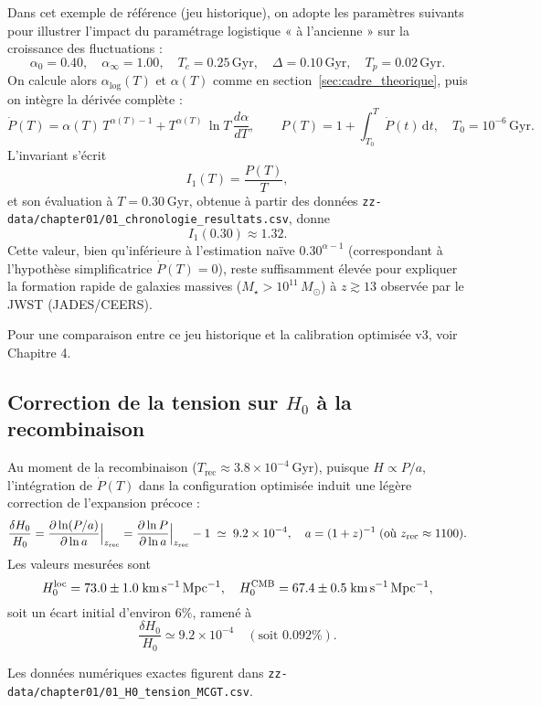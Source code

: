 Dans cet exemple de référence (jeu historique), on adopte les paramètres suivants pour illustrer l’impact du paramétrage logistique « à l’ancienne » sur la croissance des fluctuations :
\[
  \alpha_{0}=0.40,\quad
  \alpha_{\infty}=1.00,\quad
  T_{c}=0.25\,\mathrm{Gyr},\quad
  \Delta=0.10\,\mathrm{Gyr},\quad
  T_{p}=0.02\,\mathrm{Gyr}.
\]
On calcule alors \(\alpha_{\mathrm{log}}(T)\) et \(\alpha(T)\) comme en section~\ref{sec:cadre_theorique}, puis on intègre la dérivée complète :
\[
  \dot P(T)
    = \alpha(T)\,T^{\alpha(T)-1}
    + T^{\alpha(T)}\,\ln T\,\frac{d\alpha}{dT},
\qquad
  P(T)
    = 1 + \int_{T_{0}}^{T}\dot P(t)\,\mathrm{d}t,
\quad
  T_{0}=10^{-6}\,\mathrm{Gyr}.
\]
L’invariant s’écrit
\[
  I_{1}(T)=\frac{P(T)}{T},
\]
et son évaluation à \(T=0.30\) Gyr, obtenue à partir des données
\texttt{zz-data/chapter01/01\_chronologie\_resultats.csv}, donne
\[
  I_{1}(0.30)\approx1.32.
\]
Cette valeur, bien qu’inférieure à l’estimation naïve \(0.30^{\alpha-1}\) (correspondant à l’hypothèse simplificatrice \(\dot P(T)=0\)), reste suffisamment élevée pour expliquer la formation rapide de galaxies massives (\(M_{\star}>10^{11}\,M_{\odot}\)) à \(z\gtrsim13\) observée par le JWST (JADES/CEERS).

Pour une comparaison entre ce jeu historique et la calibration optimisée v3, voir Chapitre 4.

\subsection{Correction de la tension sur \(H_{0}\) à la recombinaison}

Au moment de la recombinaison (\(T_{\mathrm{rec}}\approx3.8\times10^{-4}\) Gyr),
puisque \(H\propto P/a\), l’intégration de \(\dot P(T)\) dans la configuration optimisée induit une légère correction de l’expansion précoce :
\[
  \frac{\delta H_{0}}{H_{0}}
  =\Bigl.\frac{\partial\ln(P/a)}{\partial\ln a}\Bigr|_{z_{\rm rec}}
  =\Bigl.\frac{\partial\ln P}{\partial\ln a}\Bigr|_{z_{\rm rec}} -1
  \;\simeq\;9.2\times10^{-4},
  \quad
  a=(1+z)^{-1}\;(\text{où }z_{\rm rec}\approx1100).
\]
Les valeurs mesurées sont
\[
  H_{0}^{\rm loc}=73.0\pm1.0\;\mathrm{km\,s^{-1}\,Mpc^{-1}},
  \quad
  H_{0}^{\rm CMB}=67.4\pm0.5\;\mathrm{km\,s^{-1}\,Mpc^{-1}},
\]
soit un écart initial d’environ \(6\%\), ramené à
\[
  \frac{\delta H_{0}}{H_{0}}\simeq9.2\times10^{-4}
  \quad(\text{soit }0.092\%).
\]

Les données numériques exactes figurent dans
\texttt{zz-data/chapter01/01\_H0\_tension\_MCGT.csv}.

